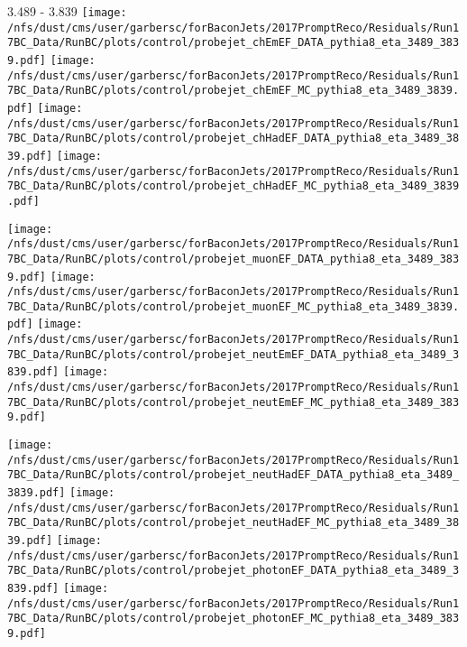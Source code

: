 \documentclass[t,compress]{beamer}
\begin{document}
\begin{frame}{3.489 - 3.839}
	\texttt{[image: /nfs/dust/cms/user/garbersc/forBaconJets/2017PromptReco/Residuals/Run17BC\_Data/RunBC/plots/control/probejet\_chEmEF\_DATA\_pythia8\_eta\_3489\_3839.pdf]}
	\texttt{[image: /nfs/dust/cms/user/garbersc/forBaconJets/2017PromptReco/Residuals/Run17BC\_Data/RunBC/plots/control/probejet\_chEmEF\_MC\_pythia8\_eta\_3489\_3839.pdf]}
	\texttt{[image: /nfs/dust/cms/user/garbersc/forBaconJets/2017PromptReco/Residuals/Run17BC\_Data/RunBC/plots/control/probejet\_chHadEF\_DATA\_pythia8\_eta\_3489\_3839.pdf]}
	\texttt{[image: /nfs/dust/cms/user/garbersc/forBaconJets/2017PromptReco/Residuals/Run17BC\_Data/RunBC/plots/control/probejet\_chHadEF\_MC\_pythia8\_eta\_3489\_3839.pdf]}
\newline

\vspace{-0.65cm}
	\texttt{[image: /nfs/dust/cms/user/garbersc/forBaconJets/2017PromptReco/Residuals/Run17BC\_Data/RunBC/plots/control/probejet\_muonEF\_DATA\_pythia8\_eta\_3489\_3839.pdf]}
	\texttt{[image: /nfs/dust/cms/user/garbersc/forBaconJets/2017PromptReco/Residuals/Run17BC\_Data/RunBC/plots/control/probejet\_muonEF\_MC\_pythia8\_eta\_3489\_3839.pdf]}
	\texttt{[image: /nfs/dust/cms/user/garbersc/forBaconJets/2017PromptReco/Residuals/Run17BC\_Data/RunBC/plots/control/probejet\_neutEmEF\_DATA\_pythia8\_eta\_3489\_3839.pdf]}
	\texttt{[image: /nfs/dust/cms/user/garbersc/forBaconJets/2017PromptReco/Residuals/Run17BC\_Data/RunBC/plots/control/probejet\_neutEmEF\_MC\_pythia8\_eta\_3489\_3839.pdf]}
\newline

\vspace{-0.65cm}
	\texttt{[image: /nfs/dust/cms/user/garbersc/forBaconJets/2017PromptReco/Residuals/Run17BC\_Data/RunBC/plots/control/probejet\_neutHadEF\_DATA\_pythia8\_eta\_3489\_3839.pdf]}
	\texttt{[image: /nfs/dust/cms/user/garbersc/forBaconJets/2017PromptReco/Residuals/Run17BC\_Data/RunBC/plots/control/probejet\_neutHadEF\_MC\_pythia8\_eta\_3489\_3839.pdf]}
	\texttt{[image: /nfs/dust/cms/user/garbersc/forBaconJets/2017PromptReco/Residuals/Run17BC\_Data/RunBC/plots/control/probejet\_photonEF\_DATA\_pythia8\_eta\_3489\_3839.pdf]}
	\texttt{[image: /nfs/dust/cms/user/garbersc/forBaconJets/2017PromptReco/Residuals/Run17BC\_Data/RunBC/plots/control/probejet\_photonEF\_MC\_pythia8\_eta\_3489\_3839.pdf]}
\end{frame}
\end{document}
